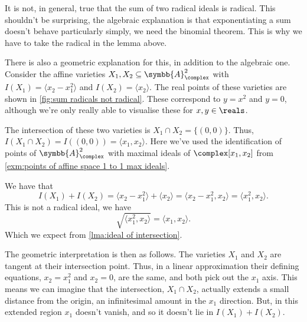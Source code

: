 \documentclass[fleqn]{NotesClass}
\newcommand{\affine}{\symbb{A}}
\begin{document}
    \begin{remark}{}{}
        It is not, in general, true that the sum of two radical ideals is radical.
        This shouldn't be surprising, the algebraic explanation is that exponentiating a sum doesn't behave particularly simply, we need the binomial theorem.
        This is why we have to take the radical in the lemma above.
        
        There is also a geometric explanation for this, in addition to the algebraic one.
        Consider the affine varieties \(X_1, X_2 \subseteq \affine^2_{\complex}\) with \(I(X_1) = \langle x_2 - x_1^2 \rangle\) and \(I(X_2) = \langle x_2 \rangle\).
        The real points of these varieties are shown in \cref{fig:sum radicals not radical}.
        These correspond to \(y = x^2\) and \(y = 0\), although we're only really able to visualise these for \(x, y \in \reals\).
        
        The intersection of these two varieties is \(X_1 \cap X_2 = \{(0, 0)\}\).
        Thus, \(I(X_1 \cap X_2) = I((0, 0)) = \langle x_1, x_2 \rangle\).
        Here we've used the identification of points of \(\affine_{\complex}^2\) with maximal ideals of \(\complex[x_1, x_2]\) from \cref{exm:points of affine space 1 to 1 max ideals}.
        
        We have that
        \begin{equation}
            I(X_1) + I(X_2) = \langle x_2 - x_1^2 \rangle + \langle x_2 \rangle = \langle x_2 - x_1^2, x_2 \rangle = \langle x_1^2, x_2 \rangle.
        \end{equation}
        This is not a radical ideal, we have
        \begin{equation}
            \sqrt{\langle x_1^2, x_2 \rangle} = \langle x_1, x_2 \rangle.
        \end{equation}
        Which we expect from \cref{lma:ideal of intersection}.
        
        The geometric interpretation is then as follows.
        The varieties \(X_1\) and \(X_2\) are tangent at their intersection point.
        Thus, in a linear approximation their defining equations, \(x_2 = x_1^2\) and \(x_2 = 0\), are the same, and both pick out the \(x_1\) axis.
        This means we can imagine that the intersection, \(X_1 \cap X_2\), actually extends a small distance from the origin, an infinitesimal amount in the \(x_1\) direction.
        But, in this extended region \(x_1\) doesn't vanish, and so it doesn't lie in \(I(X_1) + I(X_2)\).
        

\end{remark}
\end{document}
